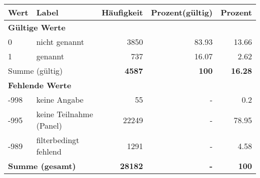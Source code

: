      \begin{longtable}{lXrrr}
     \toprule
     \textbf{Wert} & \textbf{Label} & \textbf{Häufigkeit} & \textbf{Prozent(gültig)} & \textbf{Prozent} \\
     \endhead
     \midrule
     \multicolumn{5}{l}{\textbf{Gültige Werte}}\\

     0 &
     \multicolumn{1}{X}{ nicht genannt   } &


       \num{3850} &
       \num[round-mode=places,round-precision=2]{83,93} &
         \num[round-mode=places,round-precision=2]{13,66} \\

     1 &
     \multicolumn{1}{X}{ genannt   } &


       \num{737} &
       \num[round-mode=places,round-precision=2]{16,07} &
         \num[round-mode=places,round-precision=2]{2,62} \\
     \midrule
     \multicolumn{2}{l}{Summe (gültig)} &
       \textbf{\num{4587}} &
     \textbf{100} &
       \textbf{\num[round-mode=places,round-precision=2]{16,28}} \\
     \multicolumn{5}{l}{\textbf{Fehlende Werte}}\\
       -998 &
       keine Angabe &
         \num{55} &
        - &
         \num[round-mode=places,round-precision=2]{0,2} \\
       -995 &
       keine Teilnahme (Panel) &
         \num{22249} &
        - &
         \num[round-mode=places,round-precision=2]{78,95} \\
       -989 &
       filterbedingt fehlend &
         \num{1291} &
        - &
         \num[round-mode=places,round-precision=2]{4,58} \\
     \midrule
     \multicolumn{2}{l}{\textbf{Summe (gesamt)}} &
          \textbf{\num{28182}} &
        \textbf{-} &
        \textbf{100} \\
     \bottomrule
     \end{longtable}
     
